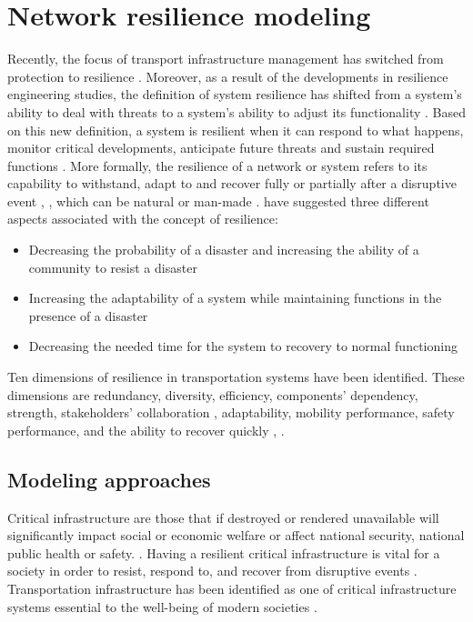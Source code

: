 \documentclass[11pt,twoside]{article}
\numberwithin{equation}{section}
\newcommand{\?}{\stackrel{?}{=}}
\begin{document}
\section{Network resilience modeling}

Recently, the focus of transport infrastructure management has switched from protection to resilience
\citep{das2020approach}. Moreover, as a result of the developments in resilience engineering studies, the definition of
system resilience has shifted from a system's ability to deal with threats to a system's ability to adjust its
functionality \citep{hollnagel2010resilience}.  Based on this new definition, a system is resilient when it can respond
to what happens, monitor critical developments, anticipate future threats and sustain required functions
\citep{hollnagel2010resilience}. More formally, the resilience of a network or system refers to its capability to
withstand, adapt to and recover fully or partially after a disruptive event \citep{aydin2018framework},
\citep{almoghathawi2019component}, which can be natural or man-made \citep{ahmed2020resilience}.
\citet{weilant2019incorporating} have suggested three different aspects associated with the concept of resilience:
\begin{itemize}
  \item Decreasing the probability of a disaster and increasing the ability of a community to resist a disaster
  \item Increasing the adaptability of a system while maintaining functions in the presence of a disaster
  \item Decreasing the needed time for the system to recovery
to normal functioning
\end{itemize}
Ten dimensions of resilience in transportation systems have been identified. These dimensions are redundancy, diversity,
efficiency, components' dependency, strength, stakeholders' collaboration \citep{ahmed2020resilience}, adaptability,
mobility performance, safety performance, and the ability to recover quickly \citep{ahmed2020resilience},
\citep{murray-tuite2006comparison}.


\subsection{Modeling approaches}
Critical infrastructure are those that if destroyed or rendered unavailable will significantly impact social or economic
welfare or affect national security, national public health or safety. \citep{skrlj2019py3plex}. Having a resilient
critical infrastructure is vital for a society in order to resist, respond to, and recover from disruptive events
\citep{tingting2020transportation}. Transportation infrastructure has been identified as one of critical infrastructure
systems essential to the well-being of modern societies \citep{zhang2016resiliencebased}.
\end{document}
